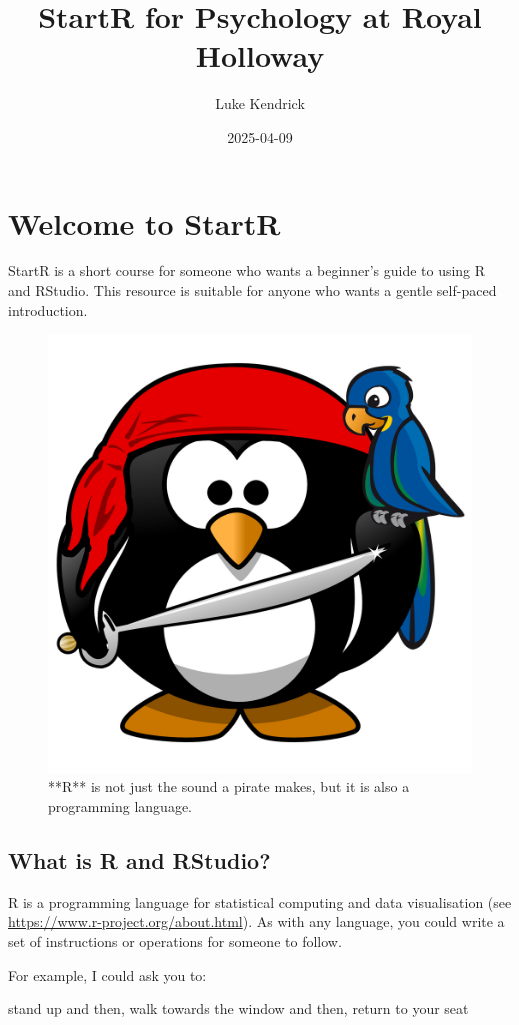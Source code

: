 \documentclass[
]{book}
\title{StartR for Psychology at Royal Holloway}
\author{Luke Kendrick}
\date{2025-04-09}
\newenvironment{Shaded}{\begin{snugshade}}{\end{snugshade}}
\newcommand{\AttributeTok}[1]{\textcolor[rgb]{0.13,0.29,0.53}{#1}}
\newcommand{\NormalTok}[1]{#1}
\newcommand{\StringTok}[1]{\textcolor[rgb]{0.31,0.60,0.02}{#1}}
\let\oldsection\section
\renewcommand{\section}{\needspace{5\baselineskip}\oldsection}
\begin{document}
\maketitle

{
\setcounter{tocdepth}{1}
\tableofcontents
}
\chapter{Welcome to StartR}\label{welcome-to-startr}

StartR is a short course for someone who wants a beginner's guide to using R and RStudio. This resource is suitable for anyone who wants a gentle self-paced introduction.

\begin{figure}

{\centering \includegraphics[width=0.25\linewidth]{images/pirate_spaced} 

}

\caption{**R** is not just the sound a pirate makes, but it is also a programming language.}\label{fig:fig1}
\end{figure}

\section{What is R and RStudio?}\label{what-is-r-and-rstudio}

R is a programming language for statistical computing and data visualisation (see \url{https://www.r-project.org/about.html}). As with any language, you could write a set of instructions or operations for someone to follow.

For example, I could ask you to:

\begin{Shaded}
\begin{Highlighting}[]
\StringTok{\textasciigrave{}}\AttributeTok{stand up}\StringTok{\textasciigrave{}}\NormalTok{ and then,}
\StringTok{\textasciigrave{}}\AttributeTok{walk towards the window}\StringTok{\textasciigrave{}}\NormalTok{ and then,}
\StringTok{\textasciigrave{}}\AttributeTok{return to your seat}\StringTok{\textasciigrave{}}
\end{Highlighting}
\end{Shaded}
\end{document}
